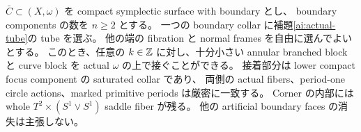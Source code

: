 \begin{theorem}
\label{ai:one-end}
$\bar C\subset(X,\omega)$ を compact symplectic surface with boundary とし、
boundary components の数を $n\ge2$ とする。
一つの boundary collar に補題\ref{ai:actual-tube}の tube を選ぶ。
他の端の fibration と normal frames を自由に選んでよいとする。
このとき、任意の $k\in\mathbb Z$ に対し、十分小さい annular branched block と
curve block を actual $\omega$ の上で接ぐことができる。
接着部分は lower compact focus component の saturated collar であり、
両側の actual fibers、period-one circle actions、marked primitive periods は厳密に一致する。
Corner の内部には whole $T^2\times(S^1\vee S^1)$ saddle fiber が残る。
他の artificial boundary faces の消失は主張しない。
\end{theorem}


